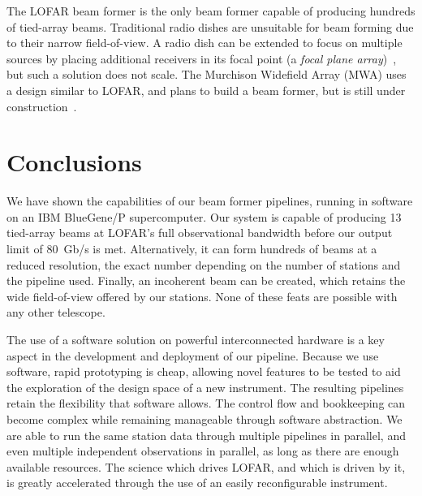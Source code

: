 \documentclass{llncs}
\begin{document}
The LOFAR beam former is the only beam former capable of producing hundreds of tied-array beams. Traditional radio dishes are unsuitable for beam forming due to their narrow field-of-view. A radio dish can be extended to focus on multiple sources by placing additional receivers in its focal point (a \emph{focal plane array})~\cite{Staveley-Smith:96}, but such a solution does not scale. The Murchison Widefield Array (MWA) uses a design similar to LOFAR, and plans to build a beam former, but is still under construction~\cite{Lonsdale:09}.



\section{Conclusions}
\label{Sec:conclusions}

We have shown the capabilities of our beam former pipelines, running in software on an IBM BlueGene/P supercomputer. Our system is capable of producing 13 tied-array beams at LOFAR's full observational bandwidth before our output limit of 80~Gb/s is met. Alternatively, it can form hundreds of beams at a reduced resolution, the exact number depending on the number of stations and the pipeline used. Finally, an incoherent beam can be created, which retains the wide field-of-view offered by our stations. None of these feats are possible with any other telescope.

The use of a software solution on powerful interconnected hardware is a key aspect in the development and deployment of our pipeline. Because we use software, rapid prototyping is cheap, allowing novel features to be tested to aid the exploration of the design space of a new instrument. The resulting pipelines retain the flexibility that software allows. The control flow and bookkeeping can become complex while remaining manageable through software abstraction. We are able to run the same station data through multiple pipelines in parallel, and even multiple independent observations in parallel, as long as there are enough available resources. The science which drives LOFAR, and which is driven by it, is greatly accelerated through the use of an easily reconfigurable instrument.
\end{document}
